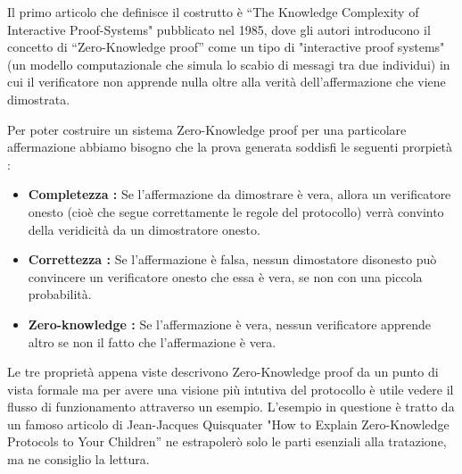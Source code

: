 Il primo articolo che definisce il costrutto è “The Knowledge Complexity of Interactive Proof-Systems"
\cite{10.1145/22145.22178} pubblicato nel 1985, dove  gli autori introducono il concetto di “Zero-Knowledge proof” come
un tipo di "interactive proof systems" (un modello computazionale che simula lo scabio di messagi tra due individui) in
cui il verificatore non apprende nulla oltre alla verità dell'affermazione che viene dimostrata.

Per poter costruire un sistema Zero-Knowledge proof per una particolare affermazione abbiamo bisogno che la prova
generata soddisfi le seguenti prorpietà :

\begin{itemize}
    \item \textbf{Completezza :} Se l'affermazione da dimostrare è vera, allora un verificatore onesto (cioè che segue
    correttamente le regole del protocollo) verrà convinto della veridicità da un dimostratore onesto.
    \item \textbf{Correttezza :} Se l'affermazione è falsa, nessun dimostatore disonesto può convincere un verificatore
    onesto che essa è vera, se non con una piccola probabilità.
    \item \textbf{Zero-knowledge :} Se l'affermazione è vera, nessun verificatore apprende altro se non il fatto che
    l'affermazione è vera.
\end{itemize}

Le tre proprietà appena viste descrivono Zero-Knowledge proof da un punto di vista formale ma per avere una visione più
intutiva del protocollo è utile vedere il flusso di funzionamento attraverso un esempio. L’esempio in questione è tratto
da un famoso articolo di Jean-Jacques Quisquater "How to Explain Zero-Knowledge Protocols to Your
Children” \cite{crypto-1989-1692} ne estrapolerò solo le parti esenziali alla tratazione, ma ne consiglio la lettura.

